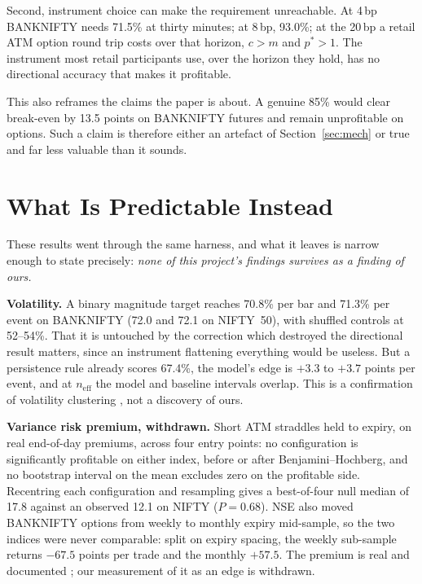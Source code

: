 \documentclass[conference]{IEEEtran}
\begin{document}
Second, instrument choice can make the requirement unreachable. At 4\,bp
BANKNIFTY needs 71.5\% at thirty minutes; at 8\,bp, 93.0\%; at the 20\,bp a
retail ATM option round trip costs over that horizon, $c > m$ and $p^{\ast} > 1$.
The instrument most retail participants use, over the horizon they hold, has no
directional accuracy that makes it profitable.

This also reframes the claims the paper is about. A genuine 85\% would clear
break-even by 13.5 points on BANKNIFTY futures and remain unprofitable on
options. Such a claim is therefore either an artefact of
Section~\ref{sec:mech} or true and far less valuable than it sounds.

\section{What Is Predictable Instead}

These results went through the same harness, and what it leaves is narrow
enough to state precisely: \emph{none of this project's findings survives as a
finding of ours.}

\textbf{Volatility.} A binary magnitude target reaches 70.8\% per bar and
71.3\% per event on BANKNIFTY (72.0 and 72.1 on NIFTY~50), with shuffled
controls at 52--54\%. That it is untouched by the correction which destroyed the
directional result matters, since an instrument flattening everything would be
useless. But a persistence rule already scores 67.4\%, the model's edge is
$+3.3$ to $+3.7$ points per event, and at $n_{\text{eff}}$ the model and
baseline intervals overlap. This is a confirmation of volatility clustering
\cite{engle1982,bollerslev1986}, not a discovery of ours.

\textbf{Variance risk premium, withdrawn.} Short ATM straddles held to expiry,
on real end-of-day premiums, across four entry points: no configuration is
significantly profitable on either index, before or after Benjamini--Hochberg,
and no bootstrap interval on the mean excludes zero on the profitable side. Recentring each
configuration and resampling gives a best-of-four null median of 17.8 against an
observed 12.1 on NIFTY ($P=0.68$). NSE also moved BANKNIFTY options from weekly
to monthly expiry mid-sample, so the two indices were never comparable: split on
expiry spacing, the weekly sub-sample returns $-67.5$ points per trade and the
monthly $+57.5$. The premium is real and documented \cite{carr2009,bakshi2003};
our measurement of it as an edge is withdrawn.
\end{document}
